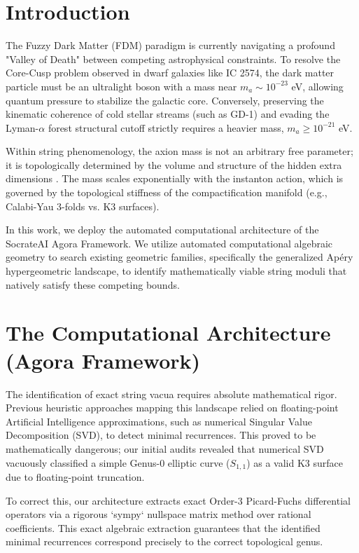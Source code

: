 \documentclass[11pt,a4paper]{article}
\begin{document}
\section{Introduction}
The Fuzzy Dark Matter (FDM) paradigm is currently navigating a profound "Valley of Death" between competing astrophysical constraints. To resolve the Core-Cusp problem observed in dwarf galaxies like IC 2574, the dark matter particle must be an ultralight boson with a mass near $m_a \sim 10^{-23}$ eV, allowing quantum pressure to stabilize the galactic core. Conversely, preserving the kinematic coherence of cold stellar streams (such as GD-1) and evading the Lyman-$\alpha$ forest structural cutoff strictly requires a heavier mass, $m_a \ge 10^{-21}$ eV. 

Within string phenomenology, the axion mass is not an arbitrary free parameter; it is topologically determined by the volume and structure of the hidden extra dimensions \cite{svrcek2006axions}. The mass scales exponentially with the instanton action, which is governed by the topological stiffness of the compactification manifold (e.g., Calabi-Yau 3-folds vs. K3 surfaces). 

In this work, we deploy the automated computational architecture of the SocrateAI Agora Framework. We utilize automated computational algebraic geometry to search existing geometric families, specifically the generalized Ap\'{e}ry hypergeometric landscape, to identify mathematically viable string moduli that natively satisfy these competing bounds.

\section{The Computational Architecture (Agora Framework)}
The identification of exact string vacua requires absolute mathematical rigor. Previous heuristic approaches mapping this landscape relied on floating-point Artificial Intelligence approximations, such as numerical Singular Value Decomposition (SVD), to detect minimal recurrences. This proved to be mathematically dangerous; our initial audits revealed that numerical SVD vacuously classified a simple Genus-0 elliptic curve ($S_{1,1}$) as a valid K3 surface due to floating-point truncation.

To correct this, our architecture extracts exact Order-3 Picard-Fuchs differential operators via a rigorous `sympy` nullspace matrix method over rational coefficients. This exact algebraic extraction guarantees that the identified minimal recurrences correspond precisely to the correct topological genus.
\end{document}
